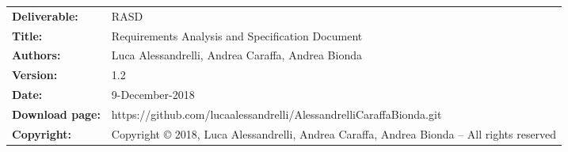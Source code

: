 \begin{table}[h!]
\begin{tabu} to \textwidth { X[0.3,r,p] X[0.7,l,p] }
\hline

\textbf{Deliverable:} & RASD\\
\textbf{Title:} & Requirements Analysis and Specification Document \\
\textbf{Authors:} & Luca Alessandrelli, Andrea Caraffa, Andrea Bionda \\
\textbf{Version:} & 1.2 \\ 
\textbf{Date:} & 9-December-2018 \\
\textbf{Download page:} & https://github.com/lucaalessandrelli/AlessandrelliCaraffaBionda.git \\
\textbf{Copyright:} & Copyright © 2018, Luca Alessandrelli, Andrea Caraffa, Andrea Bionda – All rights reserved \\
\hline
\end{tabu}
\end{table}




\setcounter{page}{2}


\newpage
{}
\tableofcontents
\newpage
{}
\listoffigures
{}
\listoftables

\clearpage
{}
\label{sect:introduction}


\clearpage
{}
\label{sect:overview}


\clearpage
{}
\label{sect:requirements}



